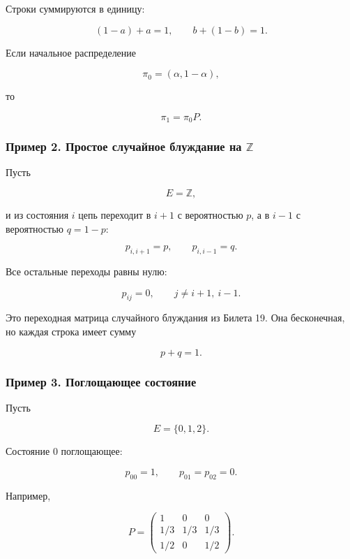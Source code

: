 \documentclass[
  11pt,
  a4paper,
]{article}
\begin{document}
Строки суммируются в единицу:

\[
(1-a)+a=1,
\qquad
b+(1-b)=1.
\]

Если начальное распределение

\[
\pi_0=(\alpha,1-\alpha),
\]

то

\[
\pi_1=\pi_0P.
\]

\subsubsection{\texorpdfstring{Пример 2. Простое случайное блуждание на
\(\mathbb Z\)}{Пример 2. Простое случайное блуждание на \textbackslash mathbb Z}}\label{ux43fux440ux438ux43cux435ux440-2.-ux43fux440ux43eux441ux442ux43eux435-ux441ux43bux443ux447ux430ux439ux43dux43eux435-ux431ux43bux443ux436ux434ux430ux43dux438ux435-ux43dux430-mathbb-z}

Пусть

\[
E=\mathbb Z,
\]

и из состояния \(i\) цепь переходит в \(i+1\) с вероятностью \(p\), а в
\(i-1\) с вероятностью \(q=1-p\):

\[
p_{i,i+1}=p,
\qquad
p_{i,i-1}=q.
\]

Все остальные переходы равны нулю:

\[
p_{ij}=0,
\qquad
j\ne i+1,\ i-1.
\]

Это переходная матрица случайного блуждания из Билета 19. Она
бесконечная, но каждая строка имеет сумму

\[
p+q=1.
\]

\subsubsection{Пример 3. Поглощающее
состояние}\label{ux43fux440ux438ux43cux435ux440-3.-ux43fux43eux433ux43bux43eux449ux430ux44eux449ux435ux435-ux441ux43eux441ux442ux43eux44fux43dux438ux435}

Пусть

\[
E=\{0,1,2\}.
\]

Состояние \(0\) поглощающее:

\[
p_{00}=1,
\qquad
p_{01}=p_{02}=0.
\]

Например,

\[
P=
\begin{pmatrix}
1 & 0 & 0\\
1/3 & 1/3 & 1/3\\
1/2 & 0 & 1/2
\end{pmatrix}.
\]
\end{document}
